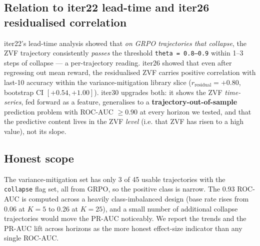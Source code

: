 \subsection{Relation to iter22 lead-time and iter26 residualised correlation}
\label{sec:zvf-iter30-relation}

iter22's lead-time analysis showed that \emph{on GRPO trajectories
that collapse}, the ZVF trajectory consistently \emph{passes} the
threshold \texttt{theta = 0.8–0.9} within 1–3 steps of collapse
--- a per-trajectory reading. iter26 showed that even after
regressing out mean reward, the residualised ZVF carries positive
correlation with last-10 accuracy within the variance-mitigation
library slice ($r_{\text{residual}}{=}+0.80$, bootstrap CI
$[+0.54, +1.00]$). iter30 upgrades both: it shows the ZVF
\emph{time-series}, fed forward as a feature, generalises to a
\textbf{trajectory-out-of-sample} prediction problem with
ROC-AUC $\ge 0.90$ at every horizon we tested, and that the
predictive content lives in the ZVF \emph{level} (i.e. that ZVF has
risen to a high value), not its slope.

\subsection{Honest scope}
\label{sec:zvf-iter30-honest}

The variance-mitigation set has only 3 of 45 usable trajectories
with the \texttt{collapse} flag set, all from GRPO, so the positive
class is narrow. The 0.93 ROC-AUC is computed across a heavily
class-imbalanced design (base rate rises from 0.06 at $K{=}5$ to
0.26 at $K{=}25$), and a small number of additional collapse
trajectories would move the PR-AUC noticeably. We report the
trends and the PR-AUC lift across horizons as the more honest
effect-size indicator than any single ROC-AUC.
